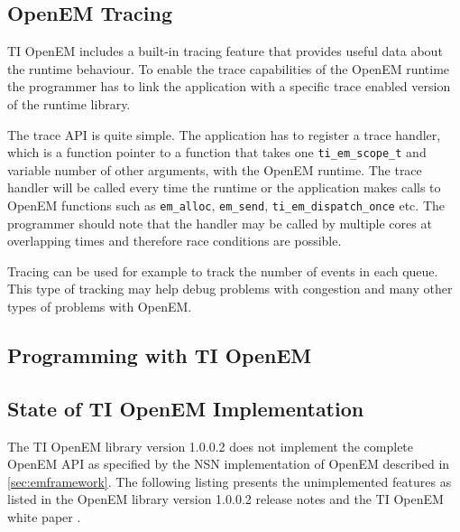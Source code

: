 \subsection{OpenEM Tracing}
\label{subsec:ti-tracing}
TI OpenEM includes a built-in tracing feature that provides useful data about the runtime behaviour. To enable the trace capabilities of the OpenEM runtime the programmer has to link the application with a specific trace enabled version of the runtime library. \cite{openemapi}

 The trace API is quite simple. The application has to register a trace handler, which is a function pointer to a function that takes one \texttt{ti\_em\_scope\_t} and variable number of other arguments, with the OpenEM runtime. The trace handler will be called every time the runtime or the application makes calls to OpenEM functions such as \texttt{em\_alloc}, \texttt{em\_send}, \texttt{ti\_em\_dispatch\_once} etc. \cite{openemapi} The programmer should note that the handler may be called by multiple cores at overlapping times and therefore race conditions are possible.

Tracing can be used for example to track the number of events in each queue. This type of tracking may help debug problems with congestion and many other types of problems with OpenEM.

\subsection{Programming with TI OpenEM}
\label{subsec:ti-init-layer}

\subsection{State of TI OpenEM Implementation}
\label{subsec:ti-implementation-state}
The TI OpenEM library version 1.0.0.2 does not implement the complete OpenEM API as specified by the NSN implementation of OpenEM described in \ref{sec:emframework}. The following listing presents the unimplemented features as listed in the OpenEM library version 1.0.0.2 release notes \cite{openemnotes} and the TI OpenEM white paper \cite{openemwhite}.

